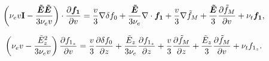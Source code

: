 \documentclass[preprint,12pt]{elsarticle}
\newcounter{bla}
\begin{document}
\begin{equation}
  \left(\nu_{e}v\mathbf{I} - \frac{\boldsymbol{\tilde{E}}\boldsymbol{\tilde{E}}}{3 \nu_{e}v}\right)\cdot
  \frac{\partial{\boldsymbol{f_1}}}{\partial{v}} = 
  \frac{v}{3}\nabla\delta f_0 + \frac{\boldsymbol{\tilde{E}}}{3 \nu_{e}}\nabla\cdot\boldsymbol{f_1}
  + \frac{v}{3}\nabla\tilde{f}_M + \frac{\boldsymbol{\tilde{E}}}{3}\frac{\partial{\tilde{f}_M}}{\partial{v}} 
  + \nu_{t}\boldsymbol{f_1},
  \nonumber \label{eq:OOE_P1AWBS_model_analysis}
\end{equation}

\begin{equation}
  \left(\nu_{e}v - \frac{\tilde{E}_z^2}{3 \nu_{e}v}\right)
  \frac{\partial{f_{1_z}}}{\partial{v}} = 
  \frac{v}{3}\frac{\partial{\delta f_0}}{\partial{z}} + \frac{\tilde{E}_z}{3 \nu_{e}}\frac{\partial{f_{1_z}}}{\partial{z}}
  + \frac{v}{3}\frac{\partial{\tilde{f}_M}}{\partial{z}} + \frac{\tilde{E}_z}{3}\frac{\partial{\tilde{f}_M}}{\partial{v}} 
  + \nu_{t}f_{1_z} .
  \label{eq:OOE_P1AWBS_model_1Danalysis}
\end{equation}
\end{document}
